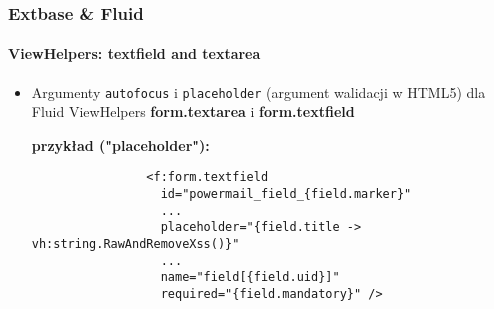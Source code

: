 
\begin{frame}[fragile]
	\frametitle{Extbase \& Fluid}
	\framesubtitle{ViewHelpers: textfield and textarea}

	\begin{itemize}
		\item Argumenty \texttt{autofocus} i \texttt{placeholder} (argument walidacji w HTML5) dla Fluid ViewHelpers \textbf{form.textarea} i \textbf{form.textfield}\newline

			\smaller\textbf{przykład ("placeholder"):}\normalsize
			\begin{lstlisting}
				<f:form.textfield
				  id="powermail_field_{field.marker}"
				  ...
				  placeholder="{field.title -> vh:string.RawAndRemoveXss()}"
				  ...
				  name="field[{field.uid}]"
				  required="{field.mandatory}" />
			\end{lstlisting}

	\end{itemize}

\end{frame}


